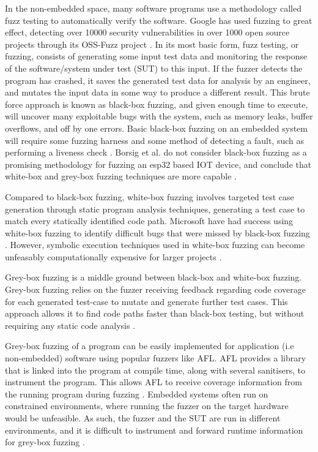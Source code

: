 \documentclass[../report.tex]{subfiles}
\begin{document}
In the non-embedded space, many software programs use a methodology called fuzz
testing to automatically verify the software. Google has used fuzzing to great
effect, detecting over 10000 security vulnerabilities in over 1000 open source
projects through its OSS-Fuzz project \citep{Google_2023}. In its most basic
form, fuzz testing, or fuzzing, consists of generating some input test data and
monitoring the response of the software/system under test (SUT) to this input.
If the fuzzer detects the program has crashed, it saves the generated test data
for analysis by an engineer, and mutates the input data in some way to produce
a different result. This brute force approach is known as black-box fuzzing,
and given enough time to execute, will uncover many exploitable bugs with the
system, such as memory leaks, buffer overflows, and off by one errors. Basic
black-box fuzzing on an embedded system will require some fuzzing harness
\citep{Eisele_et_al_2022} and some method of detecting a fault, such as
performing a liveness check \citep{Yun_2022}. Borsig et al. do not consider
black-box fuzzing as a promising methodology for fuzzing an esp32 based IOT
device, and conclude that white-box and grey-box fuzzing techniques are more
capable \citep{Borsig_2020}.

Compared to black-box fuzzing, white-box fuzzing involves targeted test case
generation through static program analysis techniques, generating a test case
to match every statically identified code path. Microsoft have had success
using white-box fuzzing to identify difficult bugs that were missed by
black-box fuzzing \citep{Godefroid_2012}. However, symbolic execution
techniques used in white-box fuzzing can become unfeasably computationally
expensive for larger projects \citep{Krishnamoorthy_2010}.

Grey-box fuzzing is a middle ground between black-box and white-box fuzzing.
Grey-box fuzzing relies on the fuzzer receiving feedback regarding code
coverage for each generated test-case to mutate and generate further test
cases. This approach allows it to find code paths faster than black-box
testing, but without requiring any static code analysis \citep{Yun_2022}.

Grey-box fuzzing of a program can be easily implemented for application (i.e
non-embedded) software using popular fuzzers like AFL. AFL provides a library
that is linked into the program at compile time, along with several sanitisers,
to instrument the program. This allows AFL to receive coverage information from
the running program during fuzzing \citep{AFL_2019}. Embedded systems often run on
constrained environments, where running the fuzzer on the target hardware would
be unfeasible. As such, the fuzzer and the SUT are run in different
environments, and it is difficult to instrument and forward runtime information
for grey-box fuzzing \citep{Muench_2018}.
\end{document}
